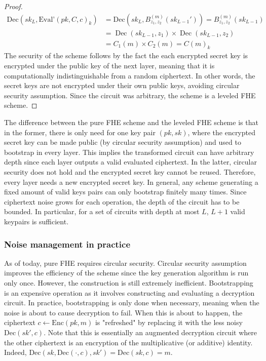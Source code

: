 \begin{proof}
\begin{equation*}
    \begin{aligned}
    \text{Dec}(sk_L, \text{Eval'}(pk, C, c)_k) &= \text{Dec}(sk_L, B_{z_1,z_2}^{(m)}(sk_{L-1}')) = B_{z_1,z_2}^{(m)}(sk_{L-1}) \\
    &= \operatorname{Dec}(sk_{L-1}, z_1) \times \operatorname{Dec}(sk_{L-1}, z_2) \\
    &= C_1(m) \times C_2(m) = C(m)_k
    \end{aligned}
\end{equation*}
The security of the scheme follows by the fact the each encrypted secret key is encrypted under the public key of the next layer, meaning that it is computationally indistinguishable from a random ciphertext. In other words, the secret keys are not encrypted under their own public keys, avoiding circular security assumption. Since the circuit was arbitrary, the scheme is a leveled FHE scheme.
\end{proof}

The difference between the pure FHE scheme and the leveled FHE scheme is that in the former, there is only need for one key pair $(pk,sk)$, where the encrypted secret key can be made public (by circular security assumption) and used to bootstrap in every layer. This implies the transformed circuit can have arbitrary depth since each layer outputs a valid evaluated ciphertext. In the latter, circular security does not hold and the encrypted secret key cannot be reused. Therefore, every layer needs a new encrypted secret key. In general, any scheme generating a fixed amount of valid keys pairs can only bootstrap finitely many times. Since ciphertext noise grows for each operation, the depth of the circuit has to be bounded. In particular, for a set of circuits with depth at most $L$, $L+1$ valid keypairs is sufficient.

\subsubsection*{Noise management in practice}
As of today, pure FHE requires circular security. Circular security assumption improves the efficiency of the scheme since the key generation algorithm is run only once. However, the construction is still extremely inefficient. Bootstrapping is an expensive operation as it involves constructing and evaluating a decryption circuit. In practice, bootstrapping is only done when necessary, meaning when the noise is about to cause decryption to fail. When this is about to happen, the ciphertext $c \leftarrow \text{Enc}(pk, m)$ is "refreshed" by replacing it with the less noisy $\text{Dec}(sk',c)$. Note that this is essentially an augmented decryption circuit where the other ciphertext is an encryption of the multiplicative (or additive) identity. Indeed, $\text{Dec}(sk,\text{Dec}(\cdot,c), sk') = \text{Dec}(sk,c) = m$.